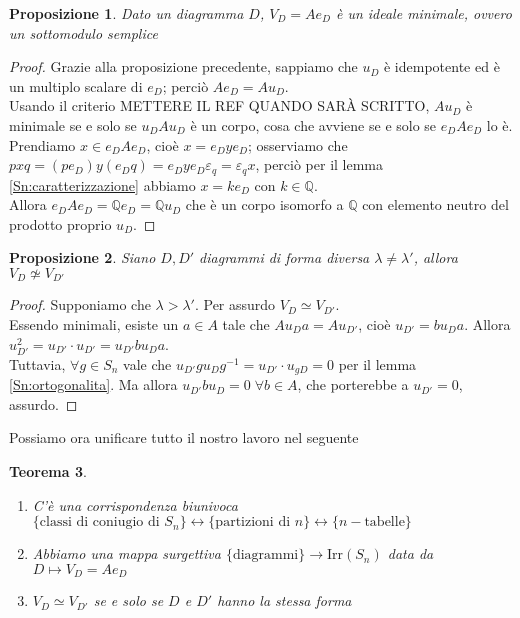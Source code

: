 \documentclass[11pt]{article}
\theoremstyle{plain}
\newtheorem{thm}{Teorema}[section]
\newtheorem{prop}[thm]{Proposizione}
\theoremstyle{definition}
\theoremstyle{remark}
\newcommand{\Q}{\mathbb{Q}}
\DeclareMathOperator{\iso}{\simeq}
\DeclareMathOperator{\noniso}{\not\simeq}
\begin{document}
\begin{prop}
	Dato un diagramma $D$, $V_D=Ae_D$ è un ideale minimale, ovvero un sottomodulo semplice
\end{prop}
\begin{proof}
	Grazie alla proposizione precedente, sappiamo che $u_D$ è idempotente ed è un multiplo scalare di $e_D$; perciò $Ae_D=Au_D$.\\
	Usando il criterio METTERE IL REF QUANDO SARÀ SCRITTO, $Au_D$ è minimale se e solo se $u_DAu_D$ è un corpo, cosa che avviene se e solo se $e_DAe_D$ lo è.\\
	Prendiamo $x\in e_DAe_D$, cioè $x=e_Dye_D$; osserviamo che $pxq=(pe_D)y(e_Dq)=e_Dye_D\varepsilon_q=\varepsilon_q x$, perciò per il lemma \eqref{Sn:caratterizzazione} abbiamo $x=ke_D$ con $k\in\Q$.\\
	Allora $e_DAe_D=\Q e_D=\Q u_D$ che è un corpo isomorfo a $\Q$ con elemento neutro del prodotto proprio $u_D$.
\end{proof}
\begin{prop}
	Siano $D,D'$ diagrammi di forma diversa $\lambda\neq\lambda'$, allora $V_D\noniso V_{D'}$
\end{prop}
\begin{proof}
	Supponiamo che $\lambda>\lambda'$. Per assurdo $V_D\iso V_{D'}$.\\
	Essendo minimali, esiste un $a\in A$ tale che $Au_Da=Au_{D'}$, cioè $u_{D'}=bu_{D}a$. Allora $u_{D'}^2=u_{D'}\cdot u_{D'}=u_{D'}bu_{D}a$.\\
	Tuttavia, $\forall g\in S_n$ vale che $u_{D'}gu_{D}g^{-1}=u_{D'}\cdot u_{gD}=0$ per il lemma \eqref{Sn:ortogonalita}. Ma allora $u_{D'}bu_{D}=0\;\forall b\in A$, che porterebbe a $u_{D'}=0$, assurdo.
\end{proof}
Possiamo ora unificare tutto il nostro lavoro nel seguente
\begin{thm}$ $
	\begin{enumerate}
		\item C'è una corrispondenza biunivoca $\{\text{classi di coniugio di }S_n\} \leftrightarrow \{\text{partizioni di }n\} \leftrightarrow \{n-\text{tabelle}\}$
		\item Abbiamo una mappa surgettiva $\{\text{diagrammi}\}\to\text{Irr}(S_n)$ data da $D\mapsto V_D=Ae_D$
		\item $V_D\iso V_{D'}$ se e solo se $D$ e $D'$ hanno la stessa forma
	\end{enumerate}
\end{thm}
\end{document}
